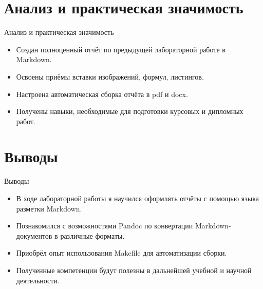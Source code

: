 \documentclass[
  ignorenonframetext,
  aspectratio=169,
  russian,
  aspectratio=169]{beamer}
\providecommand{\tightlist}{%
  \setlength{\itemsep}{0pt}\setlength{\parskip}{0pt}}
\begin{document}
\section{Анализ и практическая
значимость}\label{ux430ux43dux430ux43bux438ux437-ux438-ux43fux440ux430ux43aux442ux438ux447ux435ux441ux43aux430ux44f-ux437ux43dux430ux447ux438ux43cux43eux441ux442ux44c}

\begin{frame}{Анализ и практическая значимость}
\begin{itemize}[<+->]
\tightlist
\item
  Создан полноценный отчёт по предыдущей лабораторной работе в Markdown.
\item
  Освоены приёмы вставки изображений, формул, листингов.
\item
  Настроена автоматическая сборка отчёта в pdf и docx.
\item
  Получены навыки, необходимые для подготовки курсовых и дипломных
  работ.
\end{itemize}
\end{frame}

\section{Выводы}\label{ux432ux44bux432ux43eux434ux44b}

\begin{frame}{Выводы}
\label{ux432ux44bux432ux43eux434ux44b-1}
\begin{itemize}[<+->]
\tightlist
\item
  В ходе лабораторной работы я научился оформлять отчёты с помощью языка
  разметки Markdown.
\item
  Познакомился с возможностями Pandoc по конвертации Markdown-документов
  в различные форматы.
\item
  Приобрёл опыт использования Makefile для автоматизации сборки.
\item
  Полученные компетенции будут полезны в дальнейшей учебной и научной
  деятельности.
\end{itemize}
\end{frame}
\end{document}
